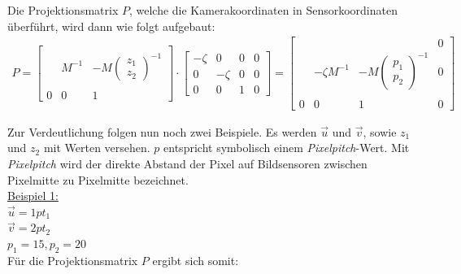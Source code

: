 		 Die Projektionsmatrix $P$, welche die Kamerakoordinaten in Sensorkoordinaten überführt, wird dann wie folgt aufgebaut:\\
		
 	\begin{gather} 		
 		P 
		=
		\begin{bmatrix}
		&&\\
		&M^{-1}& -M\begin{pmatrix}z_1\\z_2\end{pmatrix}^{-1}\\
		&&\\
		0&0&1
		\end{bmatrix}
		\cdot
		\begin{bmatrix}
		-\zeta&0&0&0\\
		0&-\zeta&0&0\\
		0&0&1&0
		\end{bmatrix}
		=
		\begin{bmatrix}
		&&&0\\
		&-\zeta M^{-1}& -M\begin{pmatrix}p_1\\p_2\end{pmatrix}^{-1}&0\\
		&&&\\
		0&0&1&0
		\end{bmatrix}
		\end{gather}
	

		
		Zur Verdeutlichung folgen nun noch zwei Beispiele. Es werden $\vec{u}$ und $\vec{v}$, sowie $z_1$ und $z_2$ mit Werten versehen. $p$ entspricht symbolisch einem \textit{Pixelpitch}-Wert. Mit \textit{Pixelpitch} wird der direkte Abstand der Pixel auf Bildsensoren zwischen Pixelmitte zu Pixelmitte bezeichnet.\\
		
		\underline{Beispiel 1:}\\
		
		$\vec{u} = 1pt_1 $\\
		$\vec{v} = 2pt_2 $\\
		$ p_1 = 15, p_2 = 20$\\
		
		Für die Projektionsmatrix $P$ ergibt sich somit:
		
